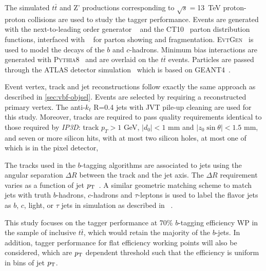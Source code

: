 The simulated $t\bar{t}$ and Z' productions corresponding to $\sqrt{s}=$13~TeV proton-proton
collisions are used to study the tagger performance. Events are generated with the
next-to-leading order generator \powheg{}~\cite{bib:powheg} and the \textsc{CT10}~\cite{Lai:2010vv}
parton distribution functions, interfaced with \pythia{}~\cite{pythia2} for parton showing and
fragmentation. \textsc{EvtGen}~\cite{Lange:2001uf} is used to model the decays of
the $b$ and $c$-hadrons. Minimum bias interactions are generated with \textsc{Pythia8}~\cite{Pythia8}
and are overlaid on the $t\bar{t}$ events. Particles are passed through the ATLAS detector
simulation~\cite{atlas_simulation} which is based on \textsc{GEANT4}~\cite{Agostinelli:2002hh}.

Event vertex, track and jet reconstructions follow exactly the same approach as described in \ref{sec:vbf-objsel}. Events are selected by requiring a reconstructed primary vertex. The anti-$k_t$ R=0.4 jets with JVT pile-up cleaning are used for this study. Moreover, tracks are required to pass quality requirements identical to those required by \textit{IP3D}: track $p_{T} > 1$ GeV, $| d_0 | <1$ mm and $| z_0 \sin \theta | <1.5$ mm, and seven or more silicon hits, with at most two silicon holes, at most one of which is in the pixel detector,

The tracks used in the $b$-tagging algorithms are associated to jets
using the angular separation $\Delta R$ between the track and the jet axis.
The $\Delta R$ requirement varies as a function of jet $p_{{\rm T}}$~\cite{ref:btagPaper}.
A similar geometric matching scheme to match jets with truth $b$-hadrons, $c$-hadrons and $\tau$-leptons
is used to label the flavor jets as $b$, $c$, light, or $\tau$ jets in simulation as described in ~\cite{ATL-PHYS-PUB-2015-022}.

This study focuses on the tagger performance at
70\% $b$-tagging efficiency WP in the sample of inclusive $t\bar{t}$, which would retain the majority of the $b$-jets.
In addition, tagger performance for flat efficiency working points will also be considered,
which are $p_{{\rm T}}$ dependent threshold such that the \btagging efficiency
is uniform in bins of jet $p_{{\rm T}}$.
